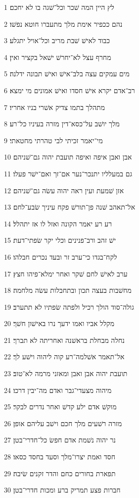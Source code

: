 \par 1 לץ היין המה שׁכר וכל־שׁגה בו לא יחכם׃
\par 2 נהם ככפיר אימת מלך מתעברו חוטא נפשׁו׃
\par 3 כבוד לאישׁ שׁבת מריב וכל־אויל יתגלע׃
\par 4 מחרף עצל לא־יחרשׁ ישׁאל בקציר ואין׃
\par 5 מים עמקים עצה בלב־אישׁ ואישׁ תבונה ידלנה׃
\par 6 רב־אדם יקרא אישׁ חסדו ואישׁ אמונים מי ימצא׃
\par 7 מתהלך בתמו צדיק אשׁרי בניו אחריו׃
\par 8 מלך יושׁב על־כסא־דין מזרה בעיניו כל־רע׃
\par 9 מי־יאמר זכיתי לבי טהרתי מחטאתי׃
\par 10 אבן ואבן איפה ואיפה תועבת יהוה גם־שׁניהם׃
\par 11 גם במעלליו יתנכר־נער אם־זך ואם־ישׁר פעלו׃
\par 12 אזן שׁמעת ועין ראה יהוה עשׂה גם־שׁניהם׃
\par 13 אל־תאהב שׁנה פן־תורשׁ פקח עיניך שׂבע־לחם׃
\par 14 רע רע יאמר הקונה ואזל לו אז יתהלל׃
\par 15 ישׁ זהב ורב־פנינים וכלי יקר שׂפתי־דעת׃
\par 16 לקח־בגדו כי־ערב זר ובעד נכרים חבלהו׃
\par 17 ערב לאישׁ לחם שׁקר ואחר ימלא־פיהו חצץ׃
\par 18 מחשׁבות בעצה תכון ובתחבלות עשׂה מלחמה׃
\par 19 גולה־סוד הולך רכיל ולפתה שׂפתיו לא תתערב׃
\par 20 מקלל אביו ואמו ידעך נרו באישׁון חשׁך׃
\par 21 נחלה מבחלת בראשׁנה ואחריתה לא תברך׃
\par 22 אל־תאמר אשׁלמה־רע קוה ליהוה וישׁע לך׃
\par 23 תועבת יהוה אבן ואבן ומאזני מרמה לא־טוב׃
\par 24 מיהוה מצעדי־גבר ואדם מה־יבין דרכו׃
\par 25 מוקשׁ אדם ילע קדשׁ ואחר נדרים לבקר׃
\par 26 מזרה רשׁעים מלך חכם וישׁב עליהם אופן׃
\par 27 נר יהוה נשׁמת אדם חפשׂ כל־חדרי־בטן׃
\par 28 חסד ואמת יצרו־מלך וסעד בחסד כסאו׃
\par 29 תפארת בחורים כחם והדר זקנים שׂיבה׃
\par 30 חברות פצע תמריק ברע ומכות חדרי־בטן׃

